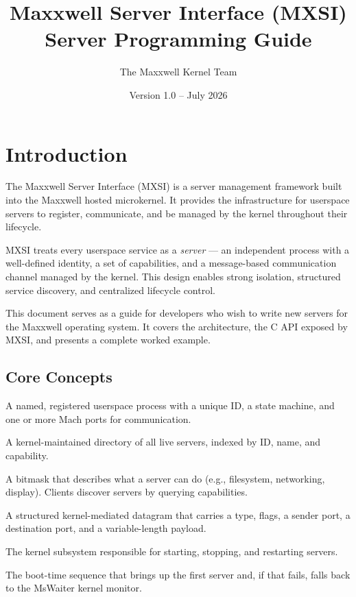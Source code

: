 \documentclass[a4paper,11pt]{article}
\title{Maxxwell Server Interface (MXSI) \\ \large Server Programming Guide}
\author{The Maxxwell Kernel Team}
\date{Version 1.0 -- July 2026}
\begin{document}
\maketitle
\thispagestyle{empty}
\newpage

\tableofcontents
\newpage

\section{Introduction}

The Maxxwell Server Interface (MXSI) is a server management framework
built into the Maxxwell hosted microkernel. It provides the
infrastructure for userspace servers to register, communicate, and
be managed by the kernel throughout their lifecycle.

MXSI treats every userspace service as a {\em server} --- an
independent process with a well-defined identity, a set of
capabilities, and a message-based communication channel managed by
the kernel. This design enables strong isolation, structured
service discovery, and centralized lifecycle control.

This document serves as a guide for developers who wish to write new
servers for the Maxxwell operating system. It covers the
architecture, the C API exposed by MXSI, and presents a complete
worked example.

\subsection{Core Concepts}

\begin{description}[leftmargin=2cm,style=nextline]
  \item[Server] A named, registered userspace process with a unique
    ID, a state machine, and one or more Mach ports for communication.
  \item[Registry] A kernel-maintained directory of all live servers,
    indexed by ID, name, and capability.
  \item[Capability] A bitmask that describes what a server can do
    (e.g., filesystem, networking, display). Clients discover servers
    by querying capabilities.
  \item[Message] A structured kernel-mediated datagram that carries
    a type, flags, a sender port, a destination port, and a
    variable-length payload.
  \item[Manager] The kernel subsystem responsible for starting,
    stopping, and restarting servers.
  \item[Bootstrap] The boot-time sequence that brings up the first
    server and, if that fails, falls back to the MsWaiter kernel
    monitor.
\end{description}
\end{document}
